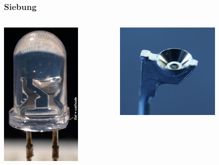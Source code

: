 \begin{frame}
    \frametitle{Siebung}
    \begin{columns}[c]
        \column[c]{5cm}
        \begin{center}
            \includegraphics[width=0.7\textwidth]{e12/Uvled_highres_macro.jpg}\\
            \tiny \hyperlink{refs}{\cite{wm}}
        \end{center}
        \column{5cm}
            \includegraphics[width=0.7\textwidth]{e12/Led_reflector.jpg}
    \end{columns}
\end{frame}

